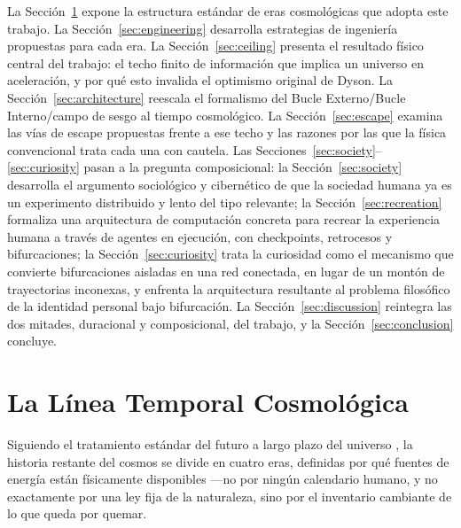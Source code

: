 \documentclass[11pt]{article}
\begin{document}
La Sección~\ref{sec:timeline} expone la estructura estándar de eras cosmológicas que adopta este trabajo. La Sección~\ref{sec:engineering} desarrolla estrategias de ingeniería propuestas para cada era. La Sección~\ref{sec:ceiling} presenta el resultado físico central del trabajo: el techo finito de información que implica un universo en aceleración, y por qué esto invalida el optimismo original de Dyson. La Sección~\ref{sec:architecture} reescala el formalismo del Bucle Externo/Bucle Interno/campo de sesgo al tiempo cosmológico. La Sección~\ref{sec:escape} examina las vías de escape propuestas frente a ese techo y las razones por las que la física convencional trata cada una con cautela. Las Secciones~\ref{sec:society}--\ref{sec:curiosity} pasan a la pregunta composicional: la Sección~\ref{sec:society} desarrolla el argumento sociológico y cibernético de que la sociedad humana ya es un experimento distribuido y lento del tipo relevante; la Sección~\ref{sec:recreation} formaliza una arquitectura de computación concreta para recrear la experiencia humana a través de agentes en ejecución, con checkpoints, retrocesos y bifurcaciones; la Sección~\ref{sec:curiosity} trata la curiosidad como el mecanismo que convierte bifurcaciones aisladas en una red conectada, en lugar de un montón de trayectorias inconexas, y enfrenta la arquitectura resultante al problema filosófico de la identidad personal bajo bifurcación. La Sección~\ref{sec:discussion} reintegra las dos mitades, duracional y composicional, del trabajo, y la Sección~\ref{sec:conclusion} concluye.

\section{La Línea Temporal Cosmológica}
\label{sec:timeline}

Siguiendo el tratamiento estándar del futuro a largo plazo del universo \citep{adams1997dying}, la historia restante del cosmos se divide en cuatro eras, definidas por qué fuentes de energía están físicamente disponibles —no por ningún calendario humano, y no exactamente por una ley fija de la naturaleza, sino por el inventario cambiante de lo que queda por quemar.
\end{document}
